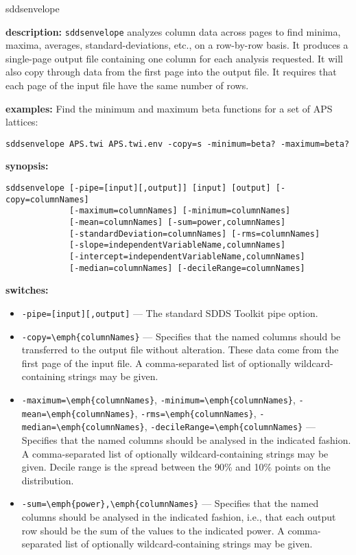 \begin{sddsprog}{sddsenvelope}
  \item \textbf{description:} {\tt sddsenvelope} analyzes column data across pages to find minima, maxima, averages, standard-deviations, etc., on a row-by-row basis. It produces a single-page output file containing one column for each analysis requested. It will also copy through data from the first page into the output file. It requires that each page of the input file have the same number of rows.
  \item \textbf{examples:} Find the minimum and maximum beta functions for a set of APS lattices:
  \begin{verbatim}
sddsenvelope APS.twi APS.twi.env -copy=s -minimum=beta? -maximum=beta?
  \end{verbatim}
  \item \textbf{synopsis:}
  \begin{verbatim}
sddsenvelope [-pipe=[input][,output]] [input] [output] [-copy=columnNames]
             [-maximum=columnNames] [-minimum=columnNames]
             [-mean=columnNames] [-sum=power,columnNames]
             [-standardDeviation=columnNames] [-rms=columnNames]
             [-slope=independentVariableName,columnNames]
             [-intercept=independentVariableName,columnNames]
             [-median=columnNames] [-decileRange=columnNames]
  \end{verbatim}
  \item \textbf{switches:}
  \begin{itemize}
    \item \verb|-pipe=[input][,output]| --- The standard SDDS Toolkit pipe option.
    \item \verb|-copy=\emph{columnNames}| --- Specifies that the named columns should be transferred to the output file without alteration. These data come from the first page of the input file. A comma-separated list of optionally wildcard-containing strings may be given.
    \item \verb|-maximum=\emph{columnNames}|, \verb|-minimum=\emph{columnNames}|, \verb|-mean=\emph{columnNames}|, \verb|-rms=\emph{columnNames}|, \verb|-median=\emph{columnNames}|, \verb|-decileRange=\emph{columnNames}| --- Specifies that the named columns should be analysed in the indicated fashion. A comma-separated list of optionally wildcard-containing strings may be given. Decile range is the spread between the 90\% and 10\% points on the distribution.
    \item \verb|-sum=\emph{power},\emph{columnNames}| --- Specifies that the named columns should be analysed in the indicated fashion, i.e., that each output row should be the sum of the values to the indicated power. A comma-separated list of optionally wildcard-containing strings may be given.

\end{itemize}
\end{sddsprog}

